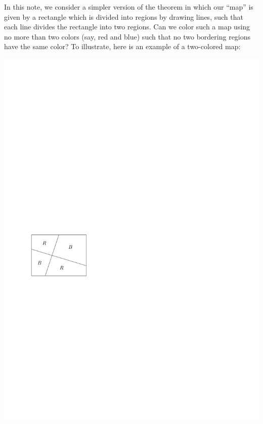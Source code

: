 \documentclass[11pt]{article}
\begin{document}
In this note, we consider a simpler version of the theorem in which our ``map'' is given by a rectangle which is divided into regions by drawing lines, such that each line divides the rectangle into two regions.  Can we color such a map using no more than two colors (say, red and blue) such that no two bordering regions have the same color? To illustrate, here is an example of a two-colored map:
\begin{center}
\includegraphics[scale = 0.9]{2color4}
\end{center}
\end{document}
